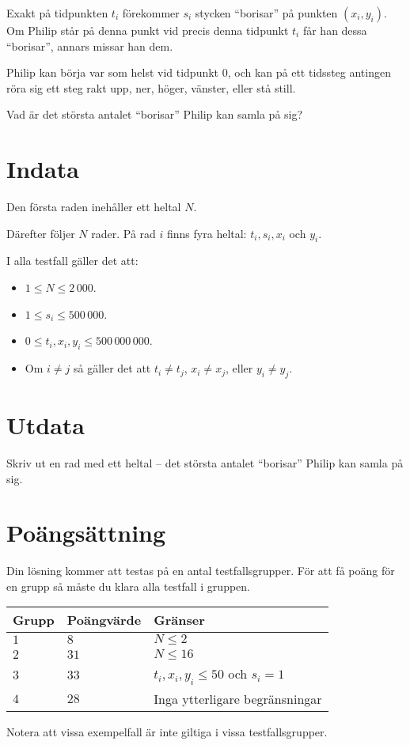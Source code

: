 

Exakt på tidpunkten $t_{i}$ förekommer $s_{i}$ stycken ``borisar'' på punkten $(x_{i}, y_{i})$. Om Philip står på denna punkt vid precis denna tidpunkt $t_{i}$ får han dessa ``borisar'', annars missar han dem.

Philip kan börja var som helst vid tidpunkt 0, och kan på ett tidssteg antingen röra sig ett steg rakt upp, ner, höger, vänster, eller stå still.

Vad är det största antalet ``borisar'' Philip kan samla på sig?

\section*{Indata}
Den första raden inehåller ett heltal $N$.

Därefter följer $N$ rader. På rad $i$ finns fyra heltal: $t_{i}, s_{i}, x_{i}$ och $y_{i}$.

I alla testfall gäller det att:
\begin{itemize}
  \item $1 \le N \le 2\,000$.
  \item $1 \le s_{i} \le 500\,000$.
  \item $0 \le t_{i}, x_{i}, y_{i} \le 500\,000\,000$.
  \item Om $i \neq j$ så gäller det att
    $t_{i} \neq t_{j}$,
    $x_{i} \neq x_{j}$, eller
    $y_{i} \neq y_{j}$.
\end{itemize}

\section*{Utdata}
Skriv ut en rad med ett heltal -- det största antalet ``borisar'' Philip kan samla på sig.

\section*{Poängsättning}
Din lösning kommer att testas på en antal testfallsgrupper.
För att få poäng för en grupp så måste du klara alla testfall i gruppen.

\noindent
\begin{tabular}{| l | l | l |}
  \hline
  Grupp & Poängvärde & Gränser \\ \hline
  $1$   & $8$        & $N \le 2$ \\ \hline
  $2$   & $31$       & $N \le 16$ \\ \hline
  $3$   & $33$       & $t_{i},x_{i},y_{i}\le 50$ och $s_{i} = 1$ \\ \hline
  $4$   & $28$       & Inga ytterligare begränsningar \\ \hline
\end{tabular}

Notera att vissa exempelfall är inte giltiga i vissa testfallsgrupper.

